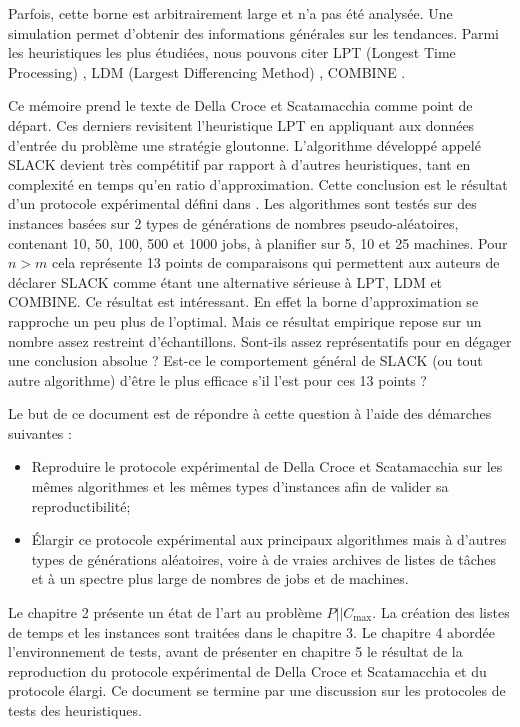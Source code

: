 \documentclass[a4paper,12pt]{report}
\theoremstyle{plain}				%
\theoremstyle{definition}				%
\newcommand\problemGrahamP{$P||C_{\max}$\xspace}
\newcommand\dcs{Della Croce et Scatamacchia\xspace}
\newcommand{\lp}[1]{\todo[author=LP,color=yellow,inline]{#1}}
\newcommand{\fco}[1]{\todo[author=FCO,color=teal,inline]{#1}}
\begin{document}
Parfois, cette borne est arbitrairement large et n'a pas été analysée. Une simulation permet d'obtenir des 
  informations générales sur les tendances.
Parmi les heuristiques les plus étudiées, nous pouvons citer 
  LPT (Longest Time Processing) \cite{graham1966bounds}, 
  LDM (Largest Differencing Method) \cite{karmarkar1982differencing}, 
  COMBINE \cite{lee1988multiprocessor}.
  
\bigskip
Ce mémoire prend le texte de \dcs \cite{della2020longest} comme point de départ.    
Ces derniers revisitent l'heuristique LPT en appliquant aux données d'entrée du problème une stratégie gloutonne.  
L'algorithme développé appelé SLACK devient très compétitif par rapport à d'autres heuristiques, 
  tant en complexité en temps qu'en ratio d'approximation. 
Cette conclusion est le résultat d'un protocole expérimental défini dans \cite{iori2008scatter}. 
Les algorithmes sont testés sur des instances basées sur 2 types de générations de nombres pseudo-aléatoires, contenant 10, 50, 100, 500 et 1000 jobs, à planifier sur 5, 10 et 25 machines. 
Pour $n > m$ cela représente 13 points de comparaisons qui permettent aux auteurs de déclarer SLACK comme étant une alternative sérieuse à LPT, LDM et COMBINE. 
Ce résultat est intéressant. En effet la borne d'approximation se rapproche un peu plus de l'optimal. 
Mais ce résultat empirique repose sur un nombre assez restreint d'échantillons. Sont-ils assez représentatifs pour en dégager une conclusion absolue ? Est-ce le comportement général de SLACK (ou tout autre algorithme) d'être le plus efficace s'il l'est pour ces 13 points ? 

Le but de ce document est de répondre à cette question à l'aide des démarches suivantes :

\begin{itemize}
	\item Reproduire le protocole expérimental de \dcs sur les mêmes algorithmes et les 
	  mêmes types d'instances afin de valider sa reproductibilité;
	  
	\item \'{E}largir ce protocole expérimental aux principaux algorithmes mais à d'autres types de générations aléatoires, voire à de vraies archives de listes de tâches et à un spectre plus large de nombres de jobs 
	et de machines.
	  
\end{itemize} 

\bigskip
Le chapitre 2 présente un état de l'art au problème \problemGrahamP. La création des listes de temps et les instances sont traitées dans le chapitre 3. Le chapitre 4 abordée l'environnement de tests, avant de présenter en chapitre 5 le résultat de la reproduction du protocole expérimental de \dcs et du protocole élargi. Ce document se termine par une discussion sur les protocoles de tests des heuristiques.
\end{document}
